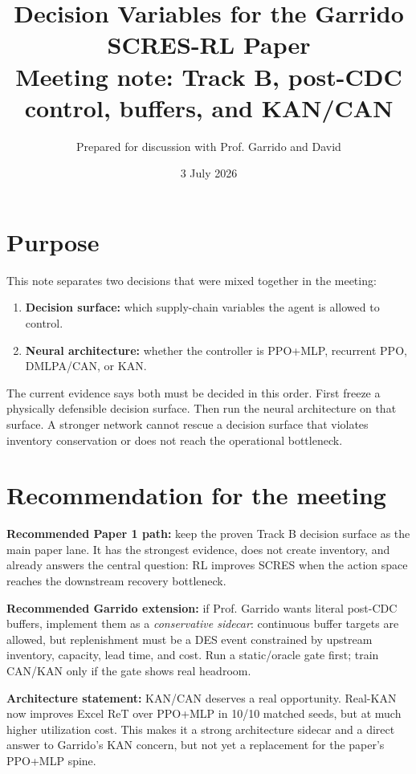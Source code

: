 \documentclass[11pt]{article}
\title{\textbf{Decision Variables for the Garrido SCRES-RL Paper}\\
\large Meeting note: Track B, post-CDC control, buffers, and KAN/CAN}
\author{Prepared for discussion with Prof. Garrido and David}
\date{3 July 2026}
\begin{document}
\maketitle

\section*{Purpose}

This note separates two decisions that were mixed together in the meeting:

\begin{enumerate}[leftmargin=1.5em]
  \item \textbf{Decision surface:} which supply-chain variables the agent is allowed to control.
  \item \textbf{Neural architecture:} whether the controller is PPO+MLP, recurrent PPO, DMLPA/CAN, or KAN.
\end{enumerate}

The current evidence says both must be decided in this order. First freeze a
physically defensible decision surface. Then run the neural architecture on that
surface. A stronger network cannot rescue a decision surface that violates
inventory conservation or does not reach the operational bottleneck.

\section*{Recommendation for the meeting}

\textbf{Recommended Paper 1 path:} keep the proven Track B decision surface as
the main paper lane. It has the strongest evidence, does not create inventory,
and already answers the central question: RL improves SCRES when the action
space reaches the downstream recovery bottleneck.

\textbf{Recommended Garrido extension:} if Prof. Garrido wants literal
post-CDC buffers, implement them as a \emph{conservative sidecar}: continuous
buffer targets are allowed, but replenishment must be a DES event constrained by
upstream inventory, capacity, lead time, and cost. Run a static/oracle gate
first; train CAN/KAN only if the gate shows real headroom.

\textbf{Architecture statement:} KAN/CAN deserves a real opportunity. Real-KAN
now improves Excel ReT over PPO+MLP in 10/10 matched seeds, but at much higher
utilization cost. This makes it a strong architecture sidecar and a direct
answer to Garrido's KAN concern, but not yet a replacement for the paper's
PPO+MLP spine.
\end{document}
